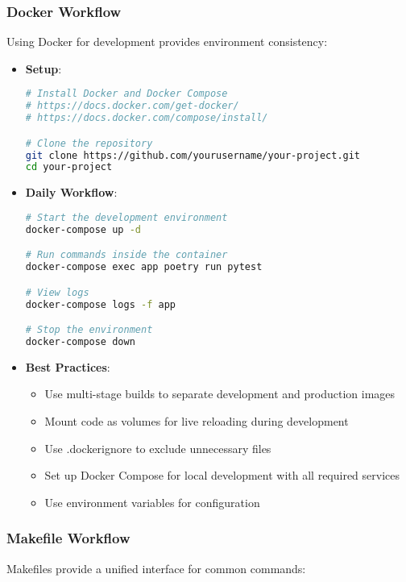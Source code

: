 \subsubsection{Docker Workflow}
Using Docker for development provides environment consistency:

\begin{itemize}
    \item \textbf{Setup}:
    \begin{lstlisting}[language=bash]
# Install Docker and Docker Compose
# https://docs.docker.com/get-docker/
# https://docs.docker.com/compose/install/

# Clone the repository
git clone https://github.com/yourusername/your-project.git
cd your-project
    \end{lstlisting}
    
    \item \textbf{Daily Workflow}:
    \begin{lstlisting}[language=bash]
# Start the development environment
docker-compose up -d

# Run commands inside the container
docker-compose exec app poetry run pytest

# View logs
docker-compose logs -f app

# Stop the environment
docker-compose down
    \end{lstlisting}
    
    \item \textbf{Best Practices}:
    \begin{itemize}
        \item Use multi-stage builds to separate development and production images
        \item Mount code as volumes for live reloading during development
        \item Use .dockerignore to exclude unnecessary files
        \item Set up Docker Compose for local development with all required services
        \item Use environment variables for configuration
    \end{itemize}
\end{itemize}

\subsubsection{Makefile Workflow}
Makefiles provide a unified interface for common commands:

